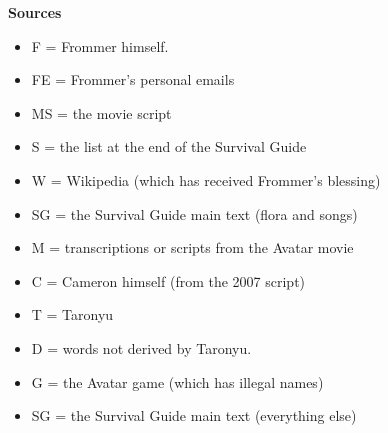 \documentclass[12pt]{amsart}
\begin{document}
{\bf Sources}
\begin{itemize}
\item F = Frommer himself.
\item FE = Frommer's personal emails
\item MS = the movie script
\item S = the list at the end of the Survival Guide
\item W = Wikipedia (which has received Frommer's blessing)
\item SG = the Survival Guide main text (flora and songs)
\item M = transcriptions or scripts from the Avatar movie
\item C = Cameron himself (from the 2007 script)
\item T = Taronyu
\item D  = words not derived by Taronyu.
\item G = the Avatar game (which has illegal names)
\item SG = the Survival Guide main text (everything else)

\end{itemize}

\newpage
\end{document}
